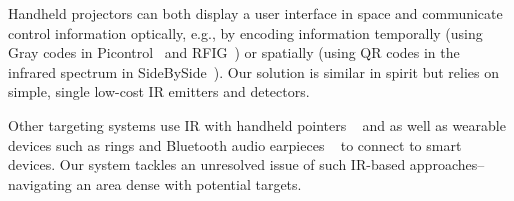 Handheld projectors can both display a user interface in space and communicate control information optically, e.g., by encoding information temporally (using Gray codes in Picontrol~\cite{schmidt_picontrol:_2012} and RFIG~\cite{raskar_rfig_2004}) or spatially (using QR codes in the infrared spectrum in SideBySide~\cite{willis_sidebyside:_2011}). Our solution is similar in spirit but relies on simple, single low-cost IR emitters and detectors. 

Other targeting systems use IR with handheld pointers ~\cite{swindells_that_2002} and as well as wearable devices such as rings and Bluetooth audio earpieces ~\cite{merrill_augmenting_2007} to connect to smart devices. Our system tackles an unresolved issue of such IR-based approaches-- navigating an area dense with potential targets.
